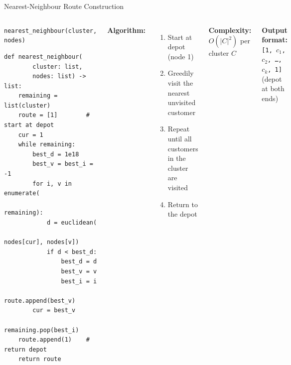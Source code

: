 \documentclass{beamer}
\begin{document}
\begin{frame}[fragile]{Nearest-Neighbour Route Construction}

\begin{columns}[T]

\begin{block}{\texttt{nearest\_neighbour(cluster, nodes)}}
\begin{lstlisting}
def nearest_neighbour(
        cluster: list,
        nodes: list) -> list:
    remaining = list(cluster)
    route = [1]        # start at depot
    cur = 1
    while remaining:
        best_d = 1e18
        best_v = best_i = -1
        for i, v in enumerate(
                remaining):
            d = euclidean(
                nodes[cur], nodes[v])
            if d < best_d:
                best_d = d
                best_v = v
                best_i = i
        route.append(best_v)
        cur = best_v
        remaining.pop(best_i)
    route.append(1)    # return depot
    return route
\end{lstlisting}
\end{block}

\small
\textbf{Algorithm:}
\begin{enumerate}
  \item Start at depot (node 1)
  \item Greedily visit the nearest unvisited customer
  \item Repeat until all customers in the cluster are visited
  \item Return to the depot
\end{enumerate}

\vspace{0.4em}
\textbf{Complexity:} $O(|C|^2)$ per cluster $C$

\vspace{0.4em}
\textbf{Output format:}\\
\texttt{[1, $c_1$, $c_2$, \ldots, $c_k$, 1]}\\
\footnotesize (depot at both ends)
\end{columns}

\end{frame}
\end{document}
